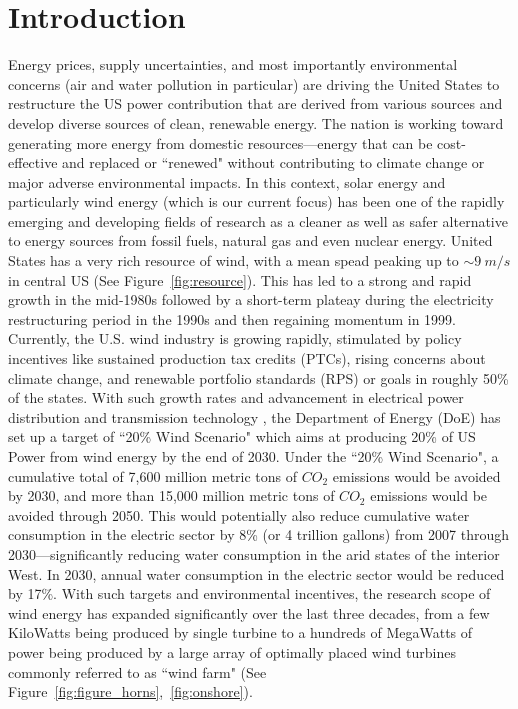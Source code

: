 
\chapter{Introduction} %

\label{Chapter1} %



Energy prices, supply uncertainties, and most importantly environmental concerns (air and water pollution in particular) are driving the United States to restructure the US power contribution that are derived from various sources  and develop diverse sources of clean, renewable energy. The nation is working toward generating more energy
from domestic resources—energy that can be cost-effective and replaced or ``renewed" without contributing to
climate change or major adverse environmental impacts. In this context, solar energy and particularly wind energy (which is our current focus) has been one of the rapidly emerging and developing fields of research as a cleaner as well as safer alternative to energy sources from fossil fuels, natural gas and even nuclear energy. United States has a very rich resource of wind, with a mean spead peaking up to $\sim 9 \ m/s$ in central US (See Figure~\ref{fig:resource}). This has led to a strong and rapid growth in the mid-1980s followed by a short-term plateay during the electricity restructuring period in the 1990s and then regaining
momentum in 1999. Currently, the U.S. wind industry is growing rapidly, stimulated by policy incentives like sustained production tax credits (PTCs), rising concerns about climate change, and renewable portfolio standards (RPS) or goals in roughly
50\% of the states. With such growth rates and advancement in electrical power distribution and transmission technology , the Department of Energy (DoE) has set up a target of ``20\% Wind Scenario" which aims at producing 20\% of US Power from wind energy by the end of 2030. Under the ``20\% Wind Scenario", a
cumulative total of 7,600 million metric tons of $CO_2$ emissions would be avoided by 2030, and more than 15,000 million metric tons of $CO_2$ emissions would be avoided through 2050. This would potentially also reduce cumulative water consumption in the electric sector by 8\% (or 4 trillion gallons) from 2007 through 2030—significantly
reducing water consumption in the arid states of the interior West. In 2030, annual water consumption in the electric sector would be reduced by 17\%. With such targets and environmental incentives, the research scope of wind energy has expanded significantly over the last three decades, from a few KiloWatts being produced by single turbine to a hundreds of MegaWatts of power being produced by a large array of optimally placed wind turbines commonly referred to as ``wind farm" (See Figure~\ref{fig:figure_horns},~\ref{fig:onshore}).

